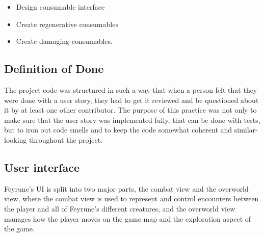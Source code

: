 {\begin{itemize}[+]
	\item Design consumable interface
	\item Create regenerative consumables
	\item Create damaging consumables.
\end{itemize}}



\subsection{Definition of Done}

The project code was structured in such a way that when a person felt that they were done with a user story,
they had to get it reviewed and be questioned about it by at least one other contributor.
The purpose of this practice was not only to make sure that the user story was implemented fully,
that can be done with tests, but to iron out code smells and to keep the code somewhat coherent and similar-looking throughout the project.

\subsection{User interface}

Feyrune's UI is split into two major parts, the combat view and the overworld view, where the combat view is used to represent and control encounters between the player and all of Feyrune's different creatures, and the overworld view manages how the player moves on the game map and the exploration aspect of the game.\\
\\
